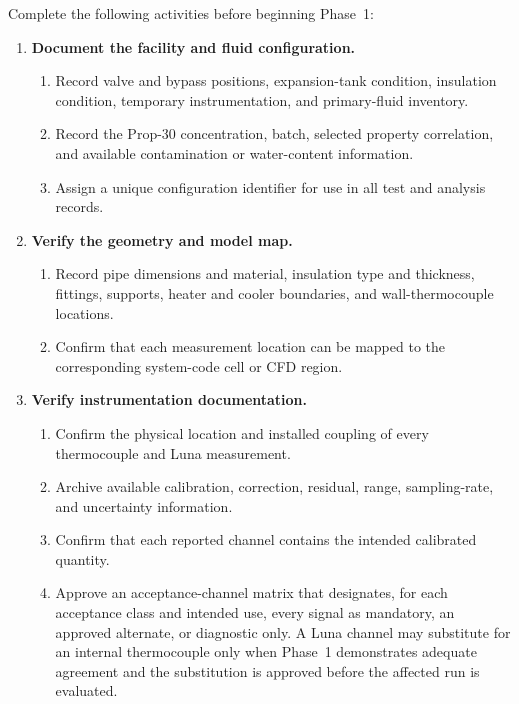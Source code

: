 \documentclass[11pt]{article}
\begin{document}
Complete the following activities before beginning Phase~1:

\begin{enumerate}
    \item \textbf{Document the facility and fluid configuration.}
    \begin{enumerate}
        \item Record valve and bypass positions, expansion-tank condition, insulation condition, temporary instrumentation, and primary-fluid inventory.
        \item Record the Prop-30 concentration, batch, selected property correlation, and available contamination or water-content information.
        \item Assign a unique configuration identifier for use in all test and analysis records.
    \end{enumerate}

    \item \textbf{Verify the geometry and model map.}
    \begin{enumerate}
        \item Record pipe dimensions and material, insulation type and thickness, fittings, supports, heater and cooler boundaries, and wall-thermocouple locations.
        \item Confirm that each measurement location can be mapped to the corresponding system-code cell or CFD region.
    \end{enumerate}

    \item \textbf{Verify instrumentation documentation.}
    \begin{enumerate}
        \item Confirm the physical location and installed coupling of every thermocouple and Luna measurement.
        \item Archive available calibration, correction, residual, range, sampling-rate, and uncertainty information.
        \item Confirm that each reported channel contains the intended calibrated quantity.
        \item Approve an acceptance-channel matrix that designates, for each acceptance class and intended use, every signal as mandatory, an approved alternate, or diagnostic only. A Luna channel may substitute for an internal thermocouple only when Phase~1 demonstrates adequate agreement and the substitution is approved before the affected run is evaluated.
    \end{enumerate}


\end{enumerate}
\end{document}
